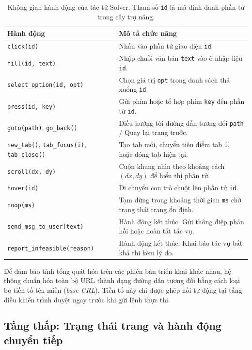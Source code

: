 \begin{table}[htbp]
  \centering
  \caption[Không gian hành động của tác tử Solver]{Không gian hành động của tác tử Solver. Tham số \texttt{id} là mã định danh phần tử trong cây trợ năng.}
  \label{tab:actions}
  \small
  \begin{tabular}{@{}L{5.4cm} L{7.8cm}@{}}
    \toprule
    \textbf{Hành động} & \textbf{Mô tả chức năng} \\
    \midrule
    \texttt{click(id)} & Nhấn vào phần tử giao diện \texttt{id}. \\
    \texttt{fill(id, text)} & Nhập chuỗi văn bản \texttt{text} vào ô nhập liệu \texttt{id}. \\
    \texttt{select\_option(id, opt)} & Chọn giá trị \texttt{opt} trong danh sách thả xuống \texttt{id}. \\
    \texttt{press(id, key)} & Gửi phím hoặc tổ hợp phím \texttt{key} đến phần tử \texttt{id}. \\
    \texttt{goto(path)}, \texttt{go\_back()} & Điều hướng tới đường dẫn tương đối \texttt{path} / Quay lại trang trước. \\
    \texttt{new\_tab()}, \texttt{tab\_focus(i)}, \texttt{tab\_close()} & Tạo tab mới, chuyển tiêu điểm tab \texttt{i}, hoặc đóng tab hiện tại. \\
    \addlinespace
    \texttt{scroll(dx, dy)} & Cuộn khung nhìn theo khoảng cách $(dx, dy)$ để hiển thị phần tử. \\
    \texttt{hover(id)} & Di chuyển con trỏ chuột lên phần tử \texttt{id}. \\
    \texttt{noop(ms)} & Tạm dừng trong khoảng thời gian \texttt{ms} chờ trạng thái trang ổn định. \\
    \addlinespace
    \texttt{send\_msg\_to\_user(text)} & Hành động kết thúc: Gửi thông điệp phản hồi hoặc hoàn tất tác vụ. \\
    \texttt{report\_infeasible(reason)} & Hành động kết thúc: Khai báo tác vụ bất khả thi kèm lý do. \\
    \bottomrule
  \end{tabular}
\end{table}

Để đảm bảo tính tổng quát hóa trên các phiên bản triển khai khác nhau, hệ thống chuẩn hóa toàn bộ URL thành dạng đường dẫn tương đối bằng cách loại bỏ tiền tố tên miền (\textit{base URL}). Tiền tố này chỉ được ghép nối tự động tại tầng điều khiển trình duyệt ngay trước khi gửi lệnh thực thi.

\subsection{Tầng thấp: Trạng thái trang và hành động chuyển tiếp}

